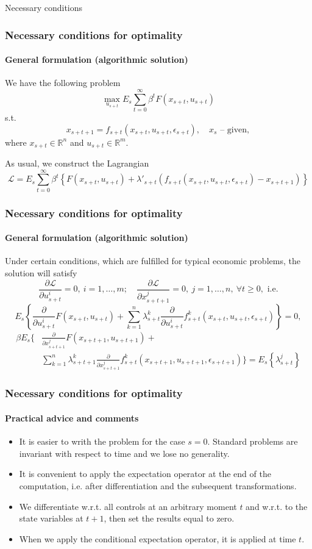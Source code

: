 \documentclass[10pt]{beamer}
\theoremstyle{definition}
\begin{document}
\begin{section}{Necessary conditions}\label{sec:NCs}

\begin{frame}
\frametitle{Necessary conditions for optimality}\framesubtitle{General formulation
(algorithmic solution)} We have the following problem
$$\max_{u_{s+t}}E_s\sum_{t=0}^\infty \beta^t F(x_{s+t},u_{s+t})$$ s.t.
$$x_{s+t+1}=f_{s+t}(x_{s+t},u_{s+t},\epsilon_{s+t}),\quad x_s\textrm{ --
given},$$ where $x_{s+t}\in \mathbb{R}^n$ and $u_{s+t}\in \mathbb{R}^m$.

As usual, we construct the Lagrangian $$\mathcal{L}=E_s\sum_{t=0}^\infty \beta^t
\left\{ F(x_{s+t},u_{s+t}) + \lambda'_{s+t}
(f_{s+t}(x_{s+t},u_{s+t},\epsilon_{s+t})-x_{s+t+1}) \right\}$$

\end{frame}


\begin{frame} \frametitle{Necessary conditions for optimality}\framesubtitle{General formulation
(algorithmic solution)} Under certain conditions, which are fulfilled for typical economic problems, the solution will satisfy 
$$\frac{\partial \mathcal{L}}{\partial u_{s+t}^i}=0,~i=1,\ldots,m; \quad \frac{\partial \mathcal{L}}{\partial x_{s+t+1}^j}=0,~j=1,\ldots,n,~\forall t \geq 0,\textrm{ i.e.} $$
$$E_s
\left\{ \frac{\partial}{\partial u_{s+t}^i}F(x_{s+t},u_{s+t}) + \sum_{k=1}^n \lambda^k_{s+t}
\frac{\partial}{\partial u_{s+t}^i}f^k_{s+t}(x_{s+t},u_{s+t},\epsilon_{s+t}) \right\}=0,$$
\begin{equation*}
    \begin{split}
\beta E_s
\Biggl\{ & \frac{\partial}{\partial x_{s+t+1}^j} F(x_{s+t+1},u_{s+t+1}) + \\ &  \sum_{k=1}^n \lambda^k_{s+t+1}
\frac{\partial}{\partial x_{s+t+1}^j}f^k_{s+t}(x_{s+t+1},u_{s+t+1},\epsilon_{s+t+1}) \Biggr\} =  E_s
\left\{ \lambda_{s+t}^j \right\}
    \end{split}
\end{equation*}
\end{frame}



\begin{frame}
\frametitle{Necessary conditions for optimality}
\framesubtitle{Practical advice and comments}
\begin{itemize}\itemsep1em
\item It is easier to writh the problem for the case $ s=0 $. Standard problems are invariant with respect to time and we lose no generality. 
\item It is convenient to apply the expectation operator at the end of the computation, i.e. after differentiation and the subsequent transformations.
\item We differentiate w.r.t. all controls at an arbitrary moment $ t $ and w.r.t. to the state variables at $ t+1 $, then set the results equal to zero.
\item When we apply the conditional expectation operator, it is applied at time $ t $.
\end{itemize}
\end{frame}




\end{section}
\end{document}
